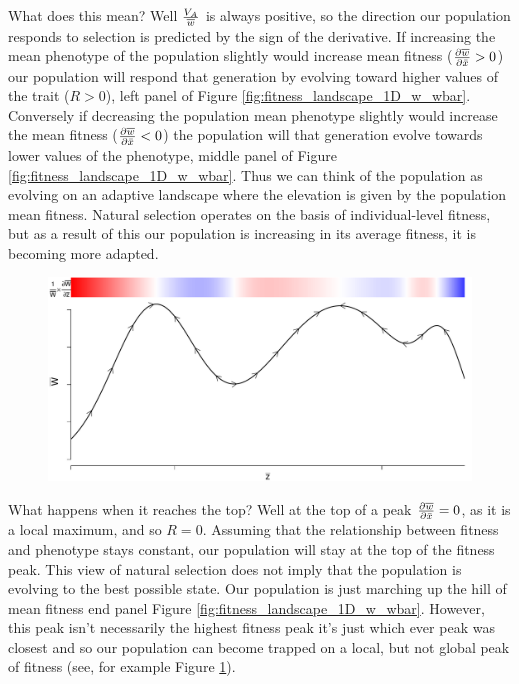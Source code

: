 What does this mean? Well $\frac{V_A}{\overline{w}}$ is always positive,
so the direction our population responds to selection is
predicted by the sign of the derivative. If increasing the mean
phenotype of the population slightly would 
increase mean fitness ($ \frac{\partial \overline{w}}{\partial \bar{x}}
>0$) our population will respond that generation by evolving toward
higher values of the trait ($R>0$), left panel of Figure \ref{fig:fitness_landscape_1D_w_wbar}. Conversely if decreasing the
population mean phenotype slightly would increase the mean fitness ($ \frac{\partial \overline{w}}{\partial \bar{x}}
<0$) the population will that generation evolve towards lower values
of the phenotype, middle panel of Figure \ref{fig:fitness_landscape_1D_w_wbar}.  Thus we can think of the population as evolving on
an adaptive landscape where the elevation is given by the population mean
fitness. Natural selection operates on the basis of individual-level
fitness, but as a result of this our population is increasing in its
average fitness, it is becoming more adapted.
 \begin{figure}
 \begin{center}
 \includegraphics[width= 0.8 \textwidth]{figures/Response_to_sel/fitness_landscape_1D.pdf}
 \end{center}
 \caption{} \label{fig:fitness_landscape_1D}  
\end{figure}
What happens when it
reaches the top? Well at the top of a peak $ \frac{\partial
  \overline{w}}{\partial \bar{x}}=0$, as it is a local maximum, and so
$R=0$. Assuming that the relationship between fitness and phenotype
stays constant, our population will stay at the top of the fitness
peak. This view of natural selection does not imply that the population
is evolving to the best possible state. Our population is just
marching up the hill of mean fitness end panel Figure
\ref{fig:fitness_landscape_1D_w_wbar}. However, this peak isn't necessarily the highest fitness peak it's just
which ever peak was closest and so our population can become trapped
on a local, but not global peak of fitness (see, for example Figure \ref{fig:fitness_landscape_1D}).

